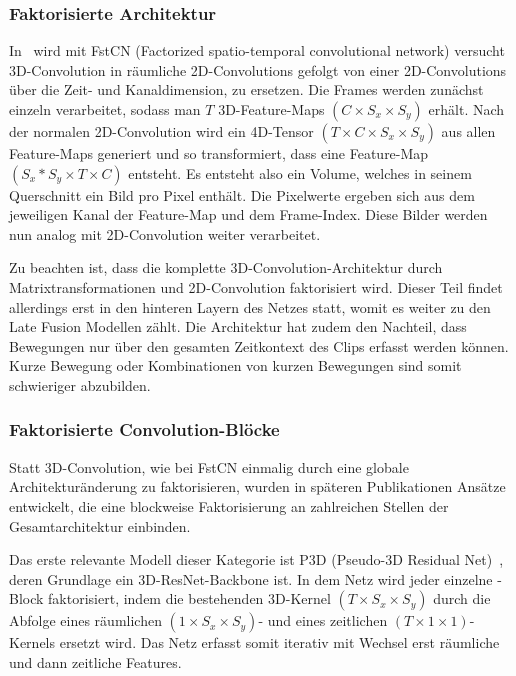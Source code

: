 \subsubsection{Faktorisierte Architektur}

In~\cite{Sun15} wird mit FstCN (Factorized spatio-temporal convolutional network) versucht 3D-Convolution in räumliche 2D-Convolutions gefolgt von einer 2D-Convolutions über die Zeit- und Kanaldimension, zu ersetzen.
Die Frames werden zunächst einzeln verarbeitet, sodass man ${T}$ 3D-Feature-Maps $(C \times S_x \times S_y)$ erhält.
Nach der normalen 2D-Convolution wird ein 4D-Tensor $(T \times C \times S_x \times S_y)$ aus allen Feature-Maps generiert und so transformiert, dass eine Feature-Map $(S_x * S_y \times T \times C)$ entsteht.
Es entsteht also ein Volume, welches in seinem Querschnitt ein Bild pro Pixel enthält.
Die Pixelwerte ergeben sich aus dem jeweiligen Kanal der Feature-Map und dem Frame-Index.
Diese Bilder werden nun analog mit 2D-Convolution weiter verarbeitet.

Zu beachten ist, dass die komplette 3D-Convolution-Architektur durch Matrixtransformationen und 2D-Convolution faktorisiert wird.
Dieser Teil findet allerdings erst in den hinteren Layern des Netzes statt, womit es weiter zu den Late Fusion Modellen zählt.
Die Architektur hat zudem den Nachteil, dass Bewegungen nur über den gesamten Zeitkontext des Clips erfasst werden können.
Kurze Bewegung oder Kombinationen von kurzen Bewegungen sind somit schwieriger abzubilden.

\subsubsection{Faktorisierte Convolution-Blöcke}


Statt 3D-Convolution, wie bei FstCN einmalig durch eine globale Architekturänderung zu faktorisieren, wurden in späteren Publikationen Ansätze entwickelt, die eine blockweise Faktorisierung an zahlreichen Stellen der Gesamtarchitektur einbinden.

Das erste relevante Modell dieser Kategorie ist P3D (Pseudo-3D Residual Net)~\cite{Qiu17}, deren Grundlage ein 3D-ResNet-Backbone ist.
In dem Netz wird jeder einzelne \res-Block faktorisiert, indem die bestehenden 3D-Kernel $(T \times S_x \times S_y)$ durch die Abfolge eines räumlichen $(1 \times S_x \times S_y)$- und eines zeitlichen $(T \times 1 \times 1)$-Kernels ersetzt wird.
Das Netz erfasst somit iterativ mit Wechsel erst räumliche und dann zeitliche Features.

